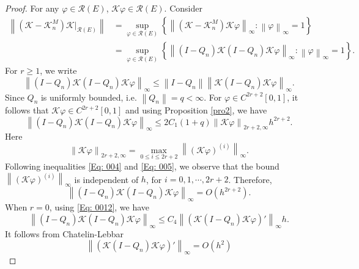 \documentclass[pdflatex, sn-mathphys-num]{sn-jnl}%
\newcommand{\norm}[1]{\left\lVert #1\right\rVert}
\theoremstyle{thmstyleone}%
\theoremstyle{thmstyletwo}%
\theoremstyle{thmstylethree}%
\begin{document}
\begin{proof}
	For any \(\varphi \in \mathcal{R}(E)\),  \( \mathcal{K}\varphi \in \mathcal{R}(E)\). Consider 
	\begin{align*}
		\norm{(\mathcal{K} - \mathcal{K}_n^M) \mathcal{K} |_{\mathcal{R}(E)}} &= \sup_{\varphi \in \mathcal{R}(E)}\left\{ 	\norm{(\mathcal{K} - \mathcal{K}_n^M) \mathcal{K}\varphi}_\infty : \norm{\varphi}_\infty =1 \right\} \\
		&= \sup_{\varphi \in \mathcal{R}(E)}\left\{ \norm{(I - Q_n) \mathcal{K}(I - Q_n)\mathcal{K}\varphi}_\infty : \norm{\varphi}_\infty =1 \right\}.
	\end{align*}
	For \(r \geq 1\), we write
	\begin{equation*}
		\norm{(I - Q_n) \mathcal{K}(I - Q_n)\mathcal{K}\varphi}_\infty \leq\norm{I - Q_n} \norm{\mathcal{K}(I - Q_n)\mathcal{K}\varphi}_\infty.
	\end{equation*}
	Since \(Q_n\) is uniformly bounded, i.e. \(\norm{Q_n} = q < \infty\). For \(\varphi \in C^{2r+2}[0,1]\), it follows that \(\mathcal{K}\varphi \in C^{2r+2}[0,1]\) and using Proposition \ref{pro2}, we have
	\begin{equation*}
		\norm{(I - Q_n) \mathcal{K}(I - Q_n)\mathcal{K}\varphi}_\infty \leq2C_1 (1 + q) \norm{\mathcal{K}\varphi}_{2r+2, \infty} h^{2r+2}.
	\end{equation*}
	Here
	\begin{equation*}
		\norm{\mathcal{K}\varphi}_{2r+2, \infty} = \max_{0 \leq i \leq 2r +2} \norm{ \left(\mathcal{K}\varphi\right)^{(i)}}_\infty.
	\end{equation*}
	Following inequalities \eqref{Eq: 004} and \eqref{Eq: 005}, we observe that the bound \(\norm{ \left(\mathcal{K}\varphi\right)^{(i)}}_\infty \) is independent of \(h\), for \(i=0, 1, \cdots, 2r+2\). Therefore, 
	\begin{equation} \label{Eq: 0035}
		\norm{(I - Q_n) \mathcal{K}(I - Q_n)\mathcal{K}\varphi}_\infty = O\left(h^{2r+2}\right).
	\end{equation}
	When \(r=0\), using \eqref{Eq: 0012}, we have
	\begin{equation*}
		\norm{(I - Q_n) \mathcal{K}(I - Q_n)\mathcal{K}\varphi}_\infty \leq C_4 \norm{\left( \mathcal{K}(I - Q_n)\mathcal{K}\varphi\right)'}_\infty h.
	\end{equation*}
	It follows from Chatelin-Lebbar \cite[Theorem 15]{Cha-Leb2}
	\begin{equation*}
		\norm{\left( \mathcal{K}(I - Q_n)\mathcal{K}\varphi\right)'}_\infty = O\left(h^{2}\right)

\end{equation*}
\end{proof}
\end{document}

